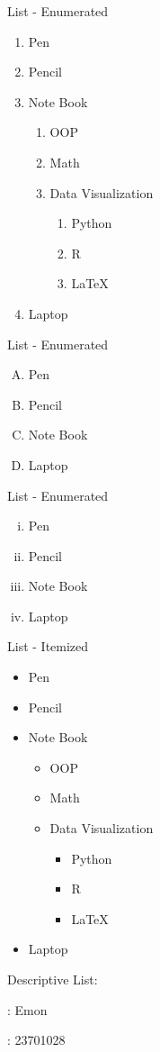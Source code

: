 \documentclass[11pt]{article}
\begin{document}
List - Enumerated\\

\begin{enumerate}
\item Pen
\item Pencil
\item Note Book
	\begin{enumerate}
	\item OOP
	\item Math
	\item Data Visualization
		\begin{enumerate}
		\item Python
		\item  R
		\item \LaTeX\
		\end{enumerate}
	\end{enumerate}
\item Laptop
\end{enumerate}

\vspace{1cm}

List - Enumerated\\

\begin{enumerate}[A.]
\item Pen
\item Pencil
\item Note Book
\item Laptop
\end{enumerate}


\vspace{1cm}

List - Enumerated\\

\begin{enumerate}[i.]
\item Pen
\item Pencil
\item Note Book
\item Laptop
\end{enumerate}



\pagebreak
List - Itemized\\
\begin{itemize}
\item Pen
\item Pencil
\item Note Book
	\begin{itemize}
	\item OOP
	\item Math
	\item Data Visualization
		\begin{itemize}
		\item Python
		\item  R
		\item \LaTeX\
		\end{itemize}
	\end{itemize}
\item Laptop
\end{itemize}
\vspace{1cm}


Descriptive List:\\
\begin{description}
\centering
\item[Name] : Emon
\item[Id] : 23701028
\end{description}
\end{document}
